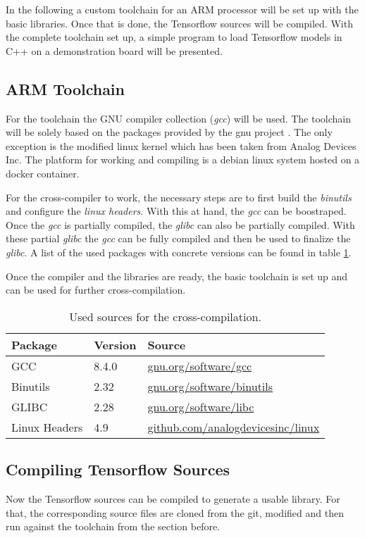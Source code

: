 In the following a custom toolchain for an ARM processor will be set up with the basic libraries. Once that is done, the Tensorflow sources will be compiled. With the complete toolchain set up, a simple program to load Tensorflow models in C++ on a demonstration board will be presented.

\subsection{ARM Toolchain}
For the toolchain the GNU compiler collection (\textit{gcc}) will be used. The toolchain will be solely based on the packages provided by the gnu project \cite{gnu-proj}. The only exception is the modified linux kernel which has been taken from Analog Devices Inc. The platform for working and compiling is a debian linux system hosted on a docker container. 

For the cross-compiler to work, the necessary steps are to first build the \textit{binutils} and configure the \textit{linux headers}. With this at hand, the \textit{gcc} can be boostraped. Once the \textit{gcc} is partially compiled, the \textit{glibc} can also be partially compiled. With these partial \textit{glibc} the \textit{gcc} can be fully compiled and then be used to finalize the \textit{glibc}. A list of the used packages with concrete versions can be found in table \ref{t:software}.

Once the compiler and the libraries are ready, the basic toolchain is set up and can be used for further cross-compilation.

\begin{table}[htb]
\centering
\caption{Used sources for the cross-compilation.}
\begin{tabular}{lll}
\toprule
Package			& Version	& Source \\ \midrule
GCC				& 8.4.0 	& \url{gnu.org/software/gcc} \\
Binutils		& 2.32 		& \url{gnu.org/software/binutils} \\
GLIBC			& 2.28		& \url{gnu.org/software/libc} \\
Linux Headers	& 4.9		& \url{github.com/analogdevicesinc/linux} \\
\bottomrule
\end{tabular}
\label{t:software}
\end{table}

\subsection{Compiling Tensorflow Sources}
Now the Tensorflow sources can be compiled to generate a usable library. For that, the corresponding source files are cloned from the git, modified and then run against the toolchain from the section before.

